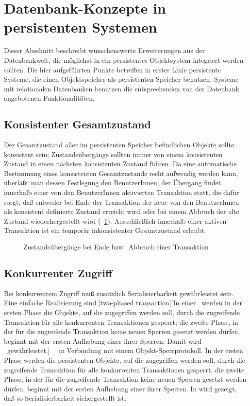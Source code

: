 \section{Datenbank-Konzepte in persistenten Systemen}%
\label{sec:dbtocl}%
%
Dieser Abschnitt beschreibt w\"{u}nschenswerte
Erweiterungen aus der Datenbankwelt, die m\"{o}g\-lichst in ein
persistentes Objektsystem integriert werden sollten. Die hier
aufgef\"{u}hrten Punkte betreffen in erster Linie persistente Systeme, die
einen Objektspeicher als persistenten Speicher benutzen;
Systeme mit relationalen Datenbanken benutzen die entsprechenden von
der Datenbank angebotenen Funktionalit\"{a}ten.
%
\subsection{Konsistenter Gesamtzustand}
%
Der Gesamtzustand aller im persistenten Speicher befindlichen Objekte
sollte konsistent sein; Zustands\"{u}berg\"{a}nge sollten immer von einem
konsistenten Zustand in einen n\"{a}chsten konsistenten Zustand
f\"{u}hren. Da eine automatische Bestimmung eines konsistenten
Gesamtzustands recht aufwendig werden kann, \"{u}berl\"{a}\ss{}t man dessen
Festlegung den BenutzerInnen; der \"{U}bergang findet innerhalb einer von
den BenutzerInnen aktivierten Transaktion statt, die daf\"{u}r sorgt,
da\ss{} entweder bei Ende der Transaktion der neue von den BenutzerInnen
als konsistent definierte Zustand erreicht wird oder bei einem Abbruch
der alte Zustand wiederhergestellt wird
\cite[]{bib:gr93} (\figurename~\ref{fig:trtime}).
Ausschlie\ss{}lich innerhalb einer aktiven Transaktion ist ein
tempor\"{a}r inkonsistenter Gesamtzustand erlaubt.
%
\begin{figure}[hbtp]%
\ifbuch%
\centerline{}%
\else%
\centerline{}%
\fi%
\caption{Zustands\"{u}berg\"{a}nge bei Ende bzw.\ Abbruch einer Transaktion}%
\label{fig:trtime}%
\end{figure}%
%
\subsection{Konkurrenter Zugriff}
%
Bei konkurrentem Zugriff mu\ss{} zus\"{a}tzlich Serialisierbarkeit
gew\"{a}hrleistet sein. Eine einfache Realisierung sind
\twophasetrs{}[two-phased
transaction][In einer \protect\twophasetr\ werden
in der ersten Phase die Objekte, auf die zugegriffen
werden soll, durch die zugreifende Transaktion f\"{u}r alle konkurrenten
Transaktionen gesperrt; die zweite Phase, in der f\"{u}r die zugreifende
Transaktion keine neuen Sperren gesetzt werden d\"{u}rfen, beginnt mit
der ersten Aufhebung einer ihrer Sperren. Damit wird
\protect{}\ gew\"{a}hrleistet.]\ %
\cite[]{bib:je87}\ in Verbindung mit einem
Objekt-Sperrprotokoll. In der
ersten Phase werden die persistenten Objekte, auf die zugegriffen
werden soll, durch die zugreifende Transaktion f\"{u}r alle konkurrenten
Transaktionen gesperrt; die zweite Phase, in der f\"{u}r die zugreifende
Transaktion keine neuen Sperren gesetzt werden d\"{u}rfen, beginnt mit
der ersten Aufhebung einer ihrer Sperren. In
\cite[]{bib:je87} wird gezeigt, da\ss{} so
Serialisierbarkeit sichergestellt ist.
%
